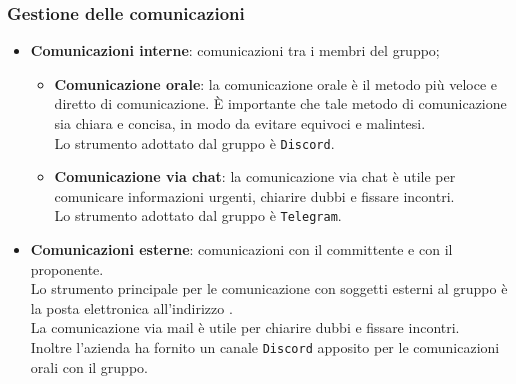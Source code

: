         \subsubsection{Gestione delle comunicazioni}
            \begin{itemize}
                \item \textbf{Comunicazioni interne}: comunicazioni tra i membri del gruppo;
                \begin{itemize}
                    \item \textbf{Comunicazione orale}: la comunicazione orale è il metodo più veloce e diretto di comunicazione. È importante che tale metodo di comunicazione sia chiara e concisa, in modo da evitare equivoci e malintesi. \\
                    Lo strumento adottato dal gruppo è \texttt{Discord}.
                    \item \textbf{Comunicazione via chat}: la comunicazione via chat è utile per comunicare informazioni urgenti, chiarire dubbi e fissare incontri.  \\
                    Lo strumento adottato dal gruppo è \texttt{Telegram}.
                \end{itemize}
                \item \textbf{Comunicazioni esterne}: comunicazioni con il committente e con il proponente. \\
                Lo strumento principale per le comunicazione con soggetti esterni al gruppo è la posta elettronica all'indirizzo \groupMail. \\
                La comunicazione via mail è utile per chiarire dubbi e fissare incontri.  \\
                Inoltre l'azienda \companyName ha fornito un canale \texttt{Discord} apposito per le comunicazioni orali con il gruppo.
            
            \end{itemize}

